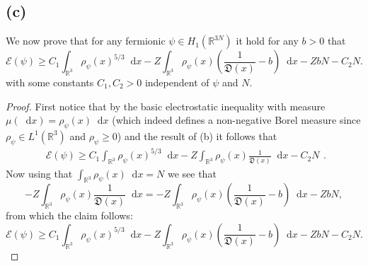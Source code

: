 \documentclass[a4paper,11pt]{article}
\newcommand*\diff{\mathop{}\!\mathrm{d}}
\newcommand{\R}{\mathbb{R}}
\numberwithin{equation}{section}
\begin{document}
 \subsection*{(c)}
 We now prove that for any fermionic $ \psi\in H_1(\R^{3N}) $ it hold for any $ b>0$ that \begin{equation}
 \mathcal{E}(\psi)\geq C_1\int_{\R^3}\rho_\psi(x)^{5/3}\diff x-Z\int_{\R^3}\rho_\psi(x)\left(\frac{1}{\mathfrak{D}(x)}-b\right)\diff x-ZbN-C_2N.
 \end{equation} 
 with some constants $ C_1,C_2>0 $ independent of $ \psi $ and $ N $.
 \begin{proof}
 	First notice that by the basic electrostatic inequality with measure $ \mu(\diff x)=\rho_\psi(x)\diff x $ (which indeed defines a non-negative Borel measure since $\rho_\psi\in L^1(\R^3)$ and $ \rho_\psi\geq0 $) and the result of (b) it follows that\begin{equation}
 	\begin{aligned}
 	\mathcal{E}(\psi)\geq C_1\int_{\R^3}\rho_\psi(x)^{5/3}\diff x-Z\int_{\R^3}\rho_\psi(x)\frac{1}{\mathfrak{D}(x)}\diff x-C_2N
 	\end{aligned}.
 	\end{equation}
 	Now using that $ \int_{\R^3}\rho_\psi(x) \diff x=N $ we see that \begin{equation}
 	-Z\int_{\R^3}\rho_\psi(x)\frac{1}{\mathfrak{D}(x)}\diff x=-Z\int_{\R^3}\rho_\psi(x)\left(\frac{1}{\mathfrak{D}(x)}-b\right)\diff x-ZbN,
 	\end{equation}
 	from which the claim follows:\begin{equation}
 	\mathcal{E}(\psi)\geq C_1\int_{\R^3}\rho_\psi(x)^{5/3}\diff x-Z\int_{\R^3}\rho_\psi(x)\left(\frac{1}{\mathfrak{D}(x)}-b\right)\diff x-ZbN-C_2N.\label{EnergyEst1}
 	\end{equation}
 \end{proof}
\end{document}
